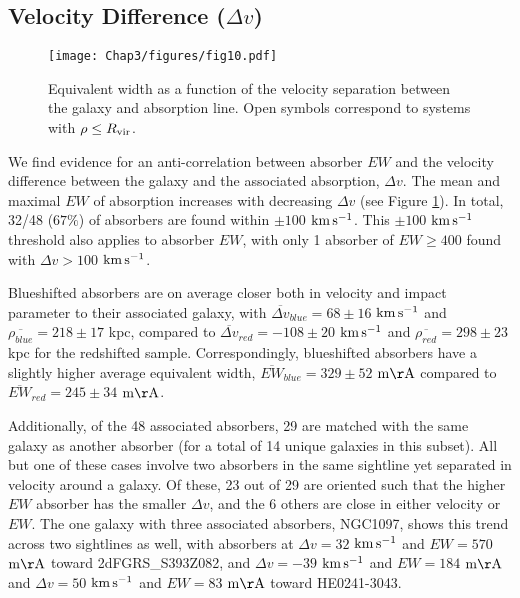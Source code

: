 \vspace{10pt}


\subsection{Velocity Difference \rm($\Delta v$\rm)}
\label{veldiff}

\begin{figure}[ht!]
        \centering
        \texttt{[image: Chap3/figures/fig10.pdf]}
        \caption{\small{Equivalent width as a function of the velocity separation between the galaxy and absorption line. Open symbols correspond to systems with $\rho \leq R_{\rm vir}$.}}
        \label{W_veldif}
        \vspace{5pt}
\end{figure} 

We find evidence for an anti-correlation between absorber $EW$ and the velocity difference between the galaxy and the associated absorption, $\Delta v$. The mean and maximal $EW$ of absorption increases with decreasing $\Delta v$ (see Figure \ref{W_veldif}). In total, 32/48 ($67\%$) of absorbers are found within $\pm100$ $\rm km\, s^{-1}$. This $\pm100$ $\rm km\, s^{-1}$ threshold also applies to absorber $EW$, with only 1 absorber of $EW \geq 400$ found with $\Delta v > 100$ $\rm km\, s^{-1}$. 

Blueshifted absorbers are on average closer both in velocity and impact parameter to their associated galaxy, with $\overline{\Delta v}_{blue} = 68\pm16$ $\rm km\, s^{-1}$ and $\overline{\rho_{blue}} = 218\pm17$ kpc,  compared to $\overline{\Delta v}_{red}=-108\pm20$ $\rm km\, s^{-1}$ and $\overline{\rho_{red}} = 298\pm23$ kpc for the redshifted sample. Correspondingly, blueshifted absorbers have a slightly higher average equivalent width, $\overline{EW}_{blue}=329\pm52$ $\rm m\AA$ compared to $\overline{EW}_{red}=245\pm34$ $\rm m\AA$.

Additionally, of the 48 associated absorbers, 29 are matched with the same galaxy as another absorber (for a total of 14 unique galaxies in this subset). All but one of these cases involve two absorbers in the same sightline yet separated in velocity around a galaxy. Of these, 23 out of 29 are oriented such that the higher $EW$ absorber has the smaller $\Delta v$, and the 6 others are close in either velocity or $EW$. The one galaxy with three associated absorbers, NGC1097, shows this trend across two sightlines as well, with absorbers at $\Delta v = 32$ $\rm km\, s^{-1}$ and $EW = 570$ $\rm m\AA$ toward 2dFGRS\_S393Z082, and $\Delta v = -39$ $\rm km\, s^{-1}$ and $EW = 184$ $\rm m\AA$ and $\Delta v = 50$ $\rm km\, s^{-1}$ and $EW = 83$ $\rm m\AA$ toward HE0241-3043.

